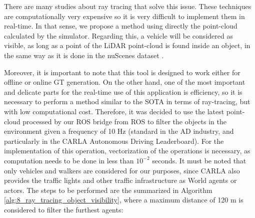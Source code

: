 There are many studies about ray tracing that solve this issue. These techniques \cite{raytracing1, raytracing2} are computationally very expensive so it is very difficult to implement them in real-time. In that sense, we propose a method using directly the point-cloud calculated by the simulator. Regarding this, a vehicle will be considered as visible, as long as a point of the LiDAR point-cloud is found inside an object, in the same way as it is done in the nuScenes dataset \cite{caesar2020nuscenes}. 

Moreover, it is important to note that this tool is designed to work either for offline or online \ac{GT} generation. On the other hand, one of the most important and delicate parts for the real-time use of this application is efficiency, so it is necessary to perform a method similar to the \ac{SOTA} in terms of ray-tracing, but with low computational cost. Therefore, it was decided to use the latest point-cloud processed by our \ac{ROS} bridge from ROS to filter the objects in the environment given a frequency of 10 Hz (standard in the \ac{AD} industry, and particularly in the \ac{CARLA} Autonomous Driving Leaderboard). For the implementation of this operation, vectorization of the operations is necessary, as computation needs to be done in less than $10^{-2}$ seconds. It must be noted that only vehicles and walkers are considered for our purposes, since \ac{CARLA} also provides the traffic lights and other traffic infrastructure as World agents or actors. The steps to be performed are the summarized in Algorithm \ref{alg:8_ray_tracing_object_visibility}, where a maximum distance of 120 m is considered to filter the furthest agents:

